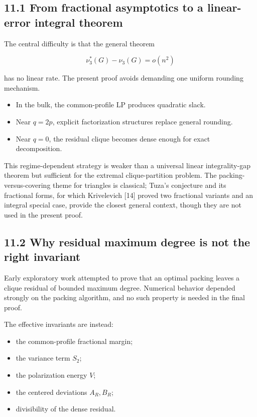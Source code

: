 \documentclass[
  american,
  11pt,
  a4paper,
]{article}
\providecommand{\tightlist}{%
  \setlength{\itemsep}{0pt}\setlength{\parskip}{0pt}}
\begin{document}
\subsection{11.1 From fractional asymptotics to a linear-error integral theorem}\label{from-fractional-asymptotics-to-a-linear-error-integral-theorem}

The central difficulty is that the general theorem

\[
\nu_3^*(G)-\nu_3(G)=o(n^2)
\]

has no linear rate. The present proof avoids demanding one uniform rounding mechanism.

\begin{itemize}
\tightlist
\item
  In the bulk, the common-profile LP produces quadratic slack.
\item
  Near \(q=2p\), explicit factorization structures replace general rounding.
\item
  Near \(q=0\), the residual clique becomes dense enough for exact decomposition.
\end{itemize}

This regime-dependent strategy is weaker than a universal linear integrality-gap theorem but sufficient for the extremal clique-partition problem. The packing-versus-covering theme for triangles is classical; Tuza's conjecture and its fractional forms, for which Krivelevich {[}14{]} proved two fractional variants and an integral special case, provide the closest general context, though they are not used in the present proof.

\subsection{11.2 Why residual maximum degree is not the right invariant}\label{why-residual-maximum-degree-is-not-the-right-invariant}

Early exploratory work attempted to prove that an optimal packing leaves a clique residual of bounded maximum degree. Numerical behavior depended strongly on the packing algorithm, and no such property is needed in the final proof.

The effective invariants are instead:

\begin{itemize}
\tightlist
\item
  the common-profile fractional margin;
\item
  the variance term \(S_2\);
\item
  the polarization energy \(V\);
\item
  the centered deviations \(A_R,B_R\);
\item
  divisibility of the dense residual.
\end{itemize}
\end{document}
